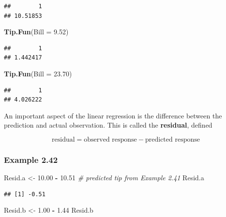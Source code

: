 \documentclass[]{book}
\newenvironment{Shaded}{\begin{snugshade}}{\end{snugshade}}
\newcommand{\CommentTok}[1]{\textcolor[rgb]{0.56,0.35,0.01}{\textit{#1}}}
\newcommand{\DataTypeTok}[1]{\textcolor[rgb]{0.13,0.29,0.53}{#1}}
\newcommand{\FloatTok}[1]{\textcolor[rgb]{0.00,0.00,0.81}{#1}}
\newcommand{\KeywordTok}[1]{\textcolor[rgb]{0.13,0.29,0.53}{\textbf{#1}}}
\newcommand{\NormalTok}[1]{#1}
\newcommand{\OperatorTok}[1]{\textcolor[rgb]{0.81,0.36,0.00}{\textbf{#1}}}
\newcommand{\StringTok}[1]{\textcolor[rgb]{0.31,0.60,0.02}{#1}}
\begin{document}
\begin{verbatim}
##        1 
## 10.51853
\end{verbatim}

\begin{Shaded}
\begin{Highlighting}[]
\KeywordTok{Tip.Fun}\NormalTok{(}\DataTypeTok{Bill =} \FloatTok{9.52}\NormalTok{)}
\end{Highlighting}
\end{Shaded}

\begin{verbatim}
##        1 
## 1.442417
\end{verbatim}

\begin{Shaded}
\begin{Highlighting}[]
\KeywordTok{Tip.Fun}\NormalTok{(}\DataTypeTok{Bill =} \FloatTok{23.70}\NormalTok{)}
\end{Highlighting}
\end{Shaded}

\begin{verbatim}
##        1 
## 4.026222
\end{verbatim}

An important aspect of the linear regression is the difference between the prediction and actual observation. This is called the \textbf{residual}, defined

\[
\mbox{residual} = \mbox{observed response} - \mbox{predicted response}
\]

\hypertarget{example-2.42}{%
\subsubsection{Example 2.42}\label{example-2.42}}

\begin{Shaded}
\begin{Highlighting}[]
\NormalTok{Resid.a <-}\StringTok{ }\FloatTok{10.00} \OperatorTok{-}\StringTok{ }\FloatTok{10.51} \CommentTok{# predicted tip from Example 2.41}
\NormalTok{Resid.a}
\end{Highlighting}
\end{Shaded}

\begin{verbatim}
## [1] -0.51
\end{verbatim}

\begin{Shaded}
\begin{Highlighting}[]
\NormalTok{Resid.b <-}\StringTok{ }\FloatTok{1.00} \OperatorTok{-}\StringTok{ }\FloatTok{1.44}
\NormalTok{Resid.b}
\end{Highlighting}
\end{Shaded}
\end{document}
